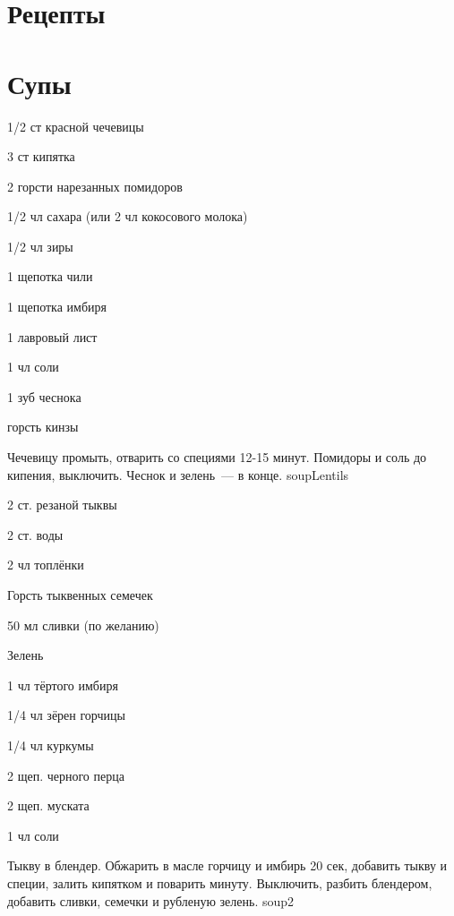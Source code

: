 \chapter{Рецепты}

\chapter*{Супы}
\label{sec:soup}



{
\item 1/2 ст красной чечевицы
\item 3 ст кипятка
\item 2 горсти нарезанных помидоров
}{
\item 1/2 чл сахара (или 2 чл кокосового молока)
\item 1/2 чл зиры
\item 1 щепотка чили
\item 1 щепотка имбиря
\item 1 лавровый лист
\item 1 чл соли
\item 1 зуб чеснока
\item горсть кинзы
}{
Чечевицу промыть, отварить со специями 12-15 минут. Помидоры и соль до кипения, выключить. Чеснок и зелень~--- в конце. %
}{}{soupLentils}




{
\item 2 ст. резаной тыквы
\item 2 ст. воды
\item 2 чл топлёнки
\item Горсть тыквенных семечек 
\item 50 мл сливки (по желанию)
\item Зелень
}{
\item 1 чл тёртого имбиря
\item 1/4 чл зёрен горчицы
\item 1/4 чл куркумы
\item 2 щеп. черного перца
\item 2 щеп. муската
\item 1 чл соли
}
{
Тыкву в блендер. Обжарить в масле горчицу и имбирь 20 сек, добавить тыкву и специи, залить кипятком и поварить минуту. Выключить, разбить блендером, добавить сливки, семечки и рубленую зелень. 
}{}{soup2}

